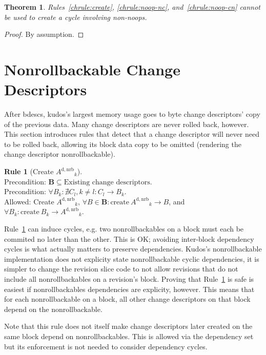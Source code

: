 \documentclass{article}
\newtheorem{thm}{Theorem}[section]
\theoremstyle{definition}
\newtheorem{chrule}{Rule}[section]
\newcommand{\cd}[1]{\ensuremath{#1}}
\newcommand{\cdb}[2]{\ensuremath{\cd{#1}_#2}}
\newcommand{\dnrb}[1]{\ensuremath{\cd{#1}^\mathrm{d,nrb}}}
\newcommand{\depends}[2]{\ensuremath{#1\! \rightarrow\! #2}}
\newcommand{\cdset}[1]{\ensuremath{\mathbf{#1}}}
\begin{document}
\begin{thm}\label{thm:noop-cnnc}
  Rules~\ref{chrule:create}, \ref{chrule:noop-nc},
  and~\ref{chrule:noop-cn} cannot be used to create a cycle involving
  non-noops.
\end{thm}
\begin{proof}
  By assumption.
\end{proof}

\section{Nonrollbackable Change Descriptors}

After bdescs, kudos's largest memory usage goes to byte change
descriptors' copy of the previous data. Many change descriptors are
never rolled back, however. This section introduces rules that detect
that a change descriptor will never need to be rolled back, allowing
its block data copy to be omitted (rendering the change descriptor
nonrollbackable).

\begin{chrule}[Create \cdb{\dnrb{A}}{k}]\label{chrule:nrb}
  \mbox{}\\
  Precondition: \(\cdset{B} \subseteq \mbox{Existing change descriptors}\).\\
  Precondition: \(\forall \cdb{B}{k}\!: \nexists \cdb{C}{l}, k \neq l\!: \depends{\cdb{C}{l}}{\cdb{B}{k}}\).\\
  Allowed: Create \cdb{\dnrb{A}}{k},
  \(\forall \cd{B}\! \in\! \cdset{B}\!: \mbox{create}\ \depends{\cdb{\dnrb{A}}{k}}{\cd{B}}\),
  and \(\forall \cdb{B}{k}\!: \mbox{create}\ \depends{\cdb{B}{k}}{\cdb{\dnrb{A}}{k}}\).\\
\end{chrule}

Rule~\ref{chrule:nrb} can induce cycles, e.g. two nonrollbackables on
a block must each be commited no later than the other. This is OK;
avoiding inter-block dependency cycles is what actually matters to
preserve dependencies. Kudos's nonrollbackable implementation does not
explicity state nonrollbackable cyclic dependencies, it is simpler to
change the revision slice code to not allow revisions that do not
include all nonrollbackables on a revision's block. Proving that
Rule~\ref{chrule:nrb} is safe is easiest if nonrollbackables
dependencies are explicity, however. This means that for each
nonrollbackable on a block, all other change descriptors on that block
depend on the nonrollbackable.

Note that this rule does not itself make change descriptors later
created on the same block depend on nonrollbackables. This is allowed
via the dependency set but its enforcement is not needed to consider
dependency cycles.
\end{document}
